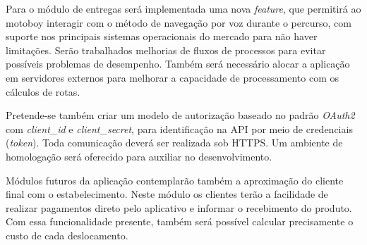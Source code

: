 Para o módulo de entregas será implementada uma nova \textit{feature}, que permitirá ao motoboy interagir com o método de navegação por voz durante o percurso, com suporte nos principais sistemas operacionais do mercado para não haver limitações. Serão trabalhados melhorias de fluxos de processos para evitar possíveis problemas de desempenho. Também será necessário alocar a aplicação em servidores externos para melhorar a capacidade de processamento com os cálculos de rotas.

Pretende-se também criar um modelo de autorização baseado no padrão \textit{OAuth2} com \textit{client\_id} e \textit{client\_secret}, para identificação na API por meio de credenciais (\textit{token}). Toda comunicação deverá ser realizada sob HTTPS. Um ambiente de homologação será oferecido para auxiliar no desenvolvimento.

Módulos futuros da aplicação contemplarão também a aproximação do cliente final com o estabelecimento. Neste módulo os clientes terão a facilidade de realizar pagamentos direto pelo aplicativo e informar o recebimento do produto. Com essa funcionalidade presente, também será possível calcular precisamente o custo de cada deslocamento.